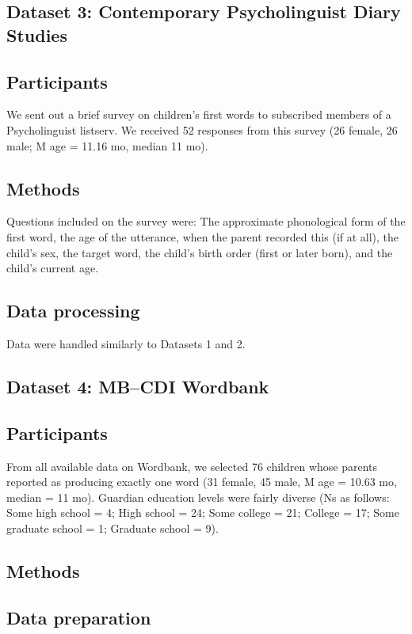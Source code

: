 \documentclass[10pt,letterpaper]{article}
\begin{document}
\subsection{Dataset 3: Contemporary Psycholinguist Diary Studies}

\subsection{Participants}
We sent out a brief survey on children's first words to subscribed members of a Psycholinguist listserv. We received 52 responses from this survey (26 female, 26 male; M age = 11.16 mo, median 11 mo).

\subsection{Methods}
Questions included on the survey were: The approximate phonological form of the first word, the age of the utterance, when the parent recorded this (if at all), the child's sex, the target word, the child's birth order (first or later born), and the child's current age. 

 \subsection{Data processing}
Data were handled similarly to Datasets 1 and 2. 

\subsection{Dataset 4: MB--CDI Wordbank}

\subsection{Participants}
From all available data on Wordbank, we selected 76 children whose parents reported as producing exactly one word (31 female, 45 male, M age = 10.63 mo, median = 11 mo). Guardian education levels were fairly diverse (Ns as follows: Some high school = 4; High school = 24; Some college = 21; College = 17; Some graduate school = 1; Graduate school = 9). 

\subsection{Methods}

\subsection{Data preparation}
\end{document}
